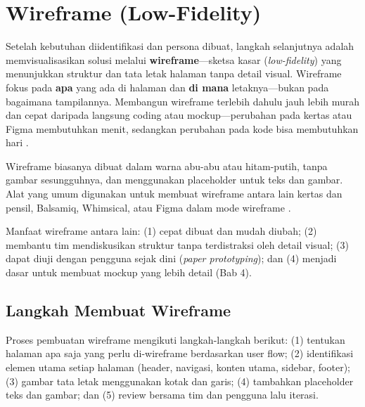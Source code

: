 ﻿\section{Wireframe (Low-Fidelity)}

Setelah kebutuhan diidentifikasi dan persona dibuat, langkah selanjutnya adalah memvisualisasikan solusi melalui \textbf{wireframe}---sketsa kasar (\textit{low-fidelity}) yang menunjukkan struktur dan tata letak halaman tanpa detail visual. Wireframe fokus pada \textbf{apa} yang ada di halaman dan \textbf{di mana} letaknya---bukan pada bagaimana tampilannya. Membangun wireframe terlebih dahulu jauh lebih murah dan cepat daripada langsung coding atau mockup---perubahan pada kertas atau Figma membutuhkan menit, sedangkan perubahan pada kode bisa membutuhkan hari \cite{mdnLearn}.

Wireframe biasanya dibuat dalam warna abu-abu atau hitam-putih, tanpa gambar sesungguhnya, dan menggunakan placeholder untuk teks dan gambar. Alat yang umum digunakan untuk membuat wireframe antara lain kertas dan pensil, Balsamiq, Whimsical, atau Figma dalam mode wireframe \cite{webdevLearn}.

Manfaat wireframe antara lain: (1) cepat dibuat dan mudah diubah; (2) membantu tim mendiskusikan struktur tanpa terdistraksi oleh detail visual; (3) dapat diuji dengan pengguna sejak dini (\textit{paper prototyping}); dan (4) menjadi dasar untuk membuat mockup yang lebih detail (Bab 4).

\subsection{Langkah Membuat Wireframe}

Proses pembuatan wireframe mengikuti langkah-langkah berikut: (1) tentukan halaman apa saja yang perlu di-wireframe berdasarkan user flow; (2) identifikasi elemen utama setiap halaman (header, navigasi, konten utama, sidebar, footer); (3) gambar tata letak menggunakan kotak dan garis; (4) tambahkan placeholder teks dan gambar; dan (5) review bersama tim dan pengguna lalu iterasi.

